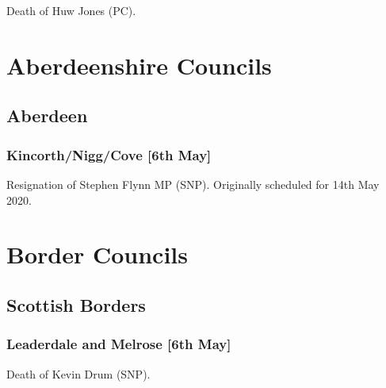 \documentclass[a4paper,openany]{book}
\begin{document}
\begin{resultsiii}

Death of Huw Jones (PC).

\section{Aberdeenshire Councils}

\subsection*{Aberdeen}

\subsubsection*{Kincorth\slash Nigg\slash Cove \hspace*{\fill}\nolinebreak[1]%
	\enspace\hspace*{\fill}
	[6th May]}


Resignation of Stephen Flynn MP (SNP).  Originally scheduled for 14th May 2020.

\section{Border Councils}

\subsection*{Scottish Borders}

\subsubsection*{Leaderdale and Melrose \hspace*{\fill}\nolinebreak[1]%
	\enspace\hspace*{\fill}
	[6th May]}


Death of Kevin Drum (SNP).


\end{resultsiii}
\end{document}

